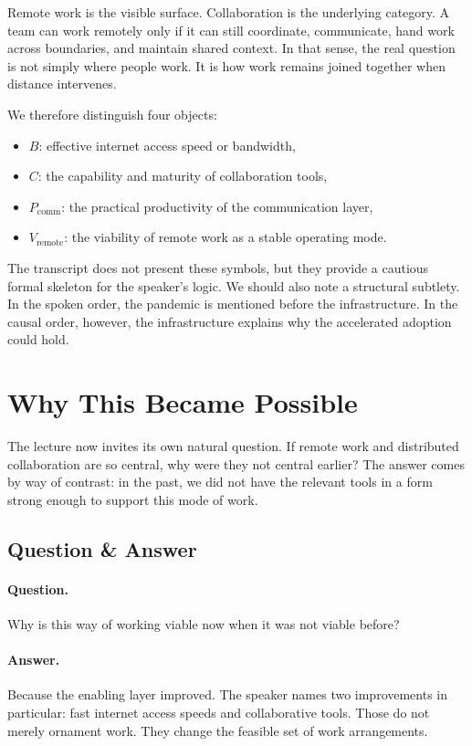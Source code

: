 Remote work is the visible surface. Collaboration is the underlying category. A team can work remotely only if it can still coordinate, communicate, hand work across boundaries, and maintain shared context. In that sense, the real question is not simply where people work. It is how work remains joined together when distance intervenes.

We therefore distinguish four objects:
\begin{itemize}
\item \(B\): effective internet access speed or bandwidth,
\item \(C\): the capability and maturity of collaboration tools,
\item \(P_{\mathrm{comm}}\): the practical productivity of the communication layer,
\item \(V_{\mathrm{remote}}\): the viability of remote work as a stable operating mode.
\end{itemize}

The transcript does not present these symbols, but they provide a cautious formal skeleton for the speaker's logic. We should also note a structural subtlety. In the spoken order, the pandemic is mentioned before the infrastructure. In the causal order, however, the infrastructure explains why the accelerated adoption could hold.

\section{Why This Became Possible}

The lecture now invites its own natural question. If remote work and distributed collaboration are so central, why were they not central earlier? The answer comes by way of contrast: in the past, we did not have the relevant tools in a form strong enough to support this mode of work.

\subsection{Question \& Answer}

\paragraph{Question.} Why is this way of working viable now when it was not viable before?

\paragraph{Answer.} Because the enabling layer improved. The speaker names two improvements in particular: fast internet access speeds and collaborative tools. Those do not merely ornament work. They change the feasible set of work arrangements.


